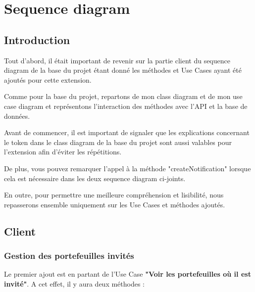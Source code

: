 \section{Sequence diagram}
\subsection{Introduction}

\begin{flushleft}
Tout d'abord, il était important de revenir sur la partie client du sequence diagram de la base du projet étant donné les méthodes et Use Cases ayant été ajoutés pour cette extension.
\end{flushleft}

\begin{flushleft}
Comme pour la base du projet, repartons de mon class diagram et de mon use case diagram et représentons l'interaction des méthodes avec l'API et la base de données.
\end{flushleft}

\begin{flushleft}
Avant de commencer, il est important de signaler que les explications concernant le token dans le class diagram de la base du projet sont aussi valables pour l'extension afin d'éviter les répétitions.
\end{flushleft}

\begin{flushleft}
De plus, vous pouvez remarquer l'appel à la méthode "createNotification" lorsque cela est nécessaire dans les deux sequence diagram ci-joints.
\end{flushleft}

\begin{flushleft}
En outre, pour permettre une meilleure compréhension et lisibilité, nous repasserons ensemble uniquement sur les Use Cases et méthodes ajoutés.
\end{flushleft}

\newpage
\subsection{Client}
\subsubsection{Gestion des portefeuilles invités}

\begin{flushleft}
Le premier ajout est en partant de l'Use Case \textbf{"Voir les portefeuilles où il est invité"}.
A cet effet, il y aura deux méthodes :
\end{flushleft}

